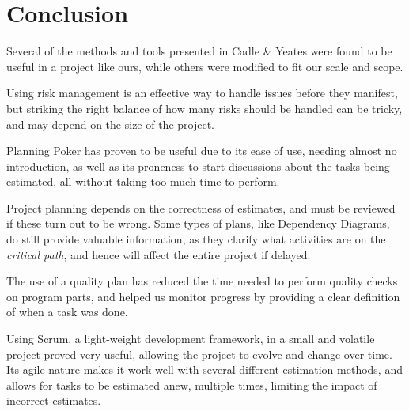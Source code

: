\section{Conclusion}

Several of the methods and tools presented in Cadle \& Yeates\cite{caye} were found to be useful in a project like ours,
while others were modified to fit our scale and scope.

Using risk management is an effective way to handle issues before they
manifest, but striking the right balance of how many risks should be handled
can be tricky, and may depend on the size of the project.

Planning Poker has proven to be useful due to its ease of use, needing
almost no introduction, as well as its proneness to start discussions about the
tasks being estimated, all without taking too much time to perform.

Project planning depends on the correctness of estimates, and must be reviewed
if these turn out to be wrong. Some types of plans, like Dependency Diagrams, do
still provide valuable information, as they clarify what activities are on the
\emph{critical path}, and hence will affect the entire project if delayed.

The use of a quality plan has reduced the time needed to perform quality checks
on program parts, and helped us monitor progress by providing a clear
definition of when a task was done.

Using Scrum, a light-weight development framework, in a small and volatile
project proved very useful, allowing the project to evolve and change over
time. Its agile nature makes it work well with several different estimation
methods, and allows for tasks to be estimated anew, multiple times, limiting
the impact of incorrect estimates.

